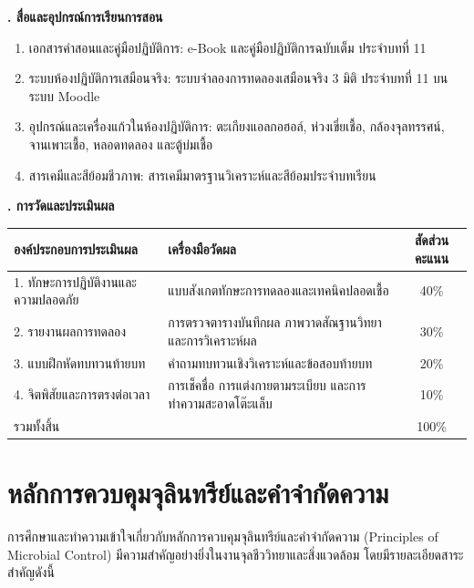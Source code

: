 \noindent\textbf{. สื่อและอุปกรณ์การเรียนการสอน}

\begin{enumerate}
    \item เอกสารคำสอนและคู่มือปฏิบัติการ: e-Book และคู่มือปฏิบัติการฉบับเต็ม ประจำบทที่ 11
    \item ระบบห้องปฏิบัติการเสมือนจริง: ระบบจำลองการทดลองเสมือนจริง 3 มิติ ประจำบทที่ 11 บนระบบ Moodle
    \item อุปกรณ์และเครื่องแก้วในห้องปฏิบัติการ: ตะเกียงแอลกอฮอล์, ห่วงเขี่ยเชื้อ, กล้องจุลทรรศน์, จานเพาะเชื้อ, หลอดทดลอง และตู้บ่มเชื้อ
    \item สารเคมีและสีย้อมชีวภาพ: สารเคมีมาตรฐานวิเคราะห์และสีย้อมประจำบทเรียน
\end{enumerate}

\noindent\textbf{. การวัดและประเมินผล}

\begin{table}[H]
\centering\small
\begin{tabularx}{\textwidth}{p{} p{} c}
\toprule
\textbf{องค์ประกอบการประเมินผล} & \textbf{เครื่องมือวัดผล} & \textbf{สัดส่วนคะแนน} \\
\midrule
1. ทักษะการปฏิบัติงานและความปลอดภัย & แบบสังเกตทักษะการทดลองและเทคนิคปลอดเชื้อ & 40\% \\
2. รายงานผลการทดลอง & การตรวจตารางบันทึกผล ภาพวาดสัณฐานวิทยา และการวิเคราะห์ผล & 30\% \\
3. แบบฝึกหัดทบทวนท้ายบท & คำถามทบทวนเชิงวิเคราะห์และข้อสอบท้ายบท & 20\% \\
4. จิตพิสัยและการตรงต่อเวลา & การเช็คชื่อ การแต่งกายตามระเบียบ และการทำความสะอาดโต๊ะแล็บ & 10\% \\
รวมทั้งสิ้น &  & 100\% \\
\bottomrule
\end{tabularx}
\end{table}

\newpage


\section{หลักการควบคุมจุลินทรีย์และคำจำกัดความ}

การศึกษาและทำความเข้าใจเกี่ยวกับหลักการควบคุมจุลินทรีย์และคำจำกัดความ (Principles of Microbial Control) มีความสำคัญอย่างยิ่งในงานจุลชีววิทยาและสิ่งแวดล้อม โดยมีรายละเอียดสาระสำคัญดังนี้

